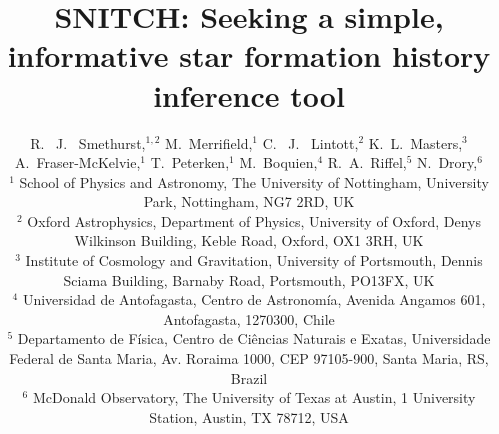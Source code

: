 \documentclass[useAMS,usenatbib]{mn2e}
\begin{document}
\title[\textsc{snitch}: inferring informative  SFHs]{SNITCH: Seeking a simple, informative star formation history inference tool}
\author[Smethurst et al. 2018]{R. ~J. ~Smethurst,$^{1,2}$ M.~Merrifield,$^{1}$ C. ~J. ~Lintott,$^{2}$ K.~L.~Masters,$^{3}$ \newauthor A.~Fraser-McKelvie,$^{1}$ T.~Peterken,$^{1}$ M.~Boquien,$^{4}$ R.~A.~Riffel,$^{5}$ N.~Drory,$^{6}$
\\ $^1$ School of Physics and Astronomy, The University of Nottingham, University Park, Nottingham, NG7 2RD, UK
\\ $^2$ Oxford Astrophysics, Department of Physics, University of Oxford, Denys Wilkinson Building, Keble Road, Oxford, OX1 3RH, UK
\\ $^3$ Institute of Cosmology and Gravitation, 
University of Portsmouth, Dennis Sciama Building, Barnaby Road, Portsmouth, PO13FX, UK
\\ $^4$ Universidad de Antofagasta, Centro de Astronom\'ia, Avenida Angamos 601, Antofagasta, 1270300, Chile
\\ $^5$ Departamento de Física, Centro de Ciências Naturais e Exatas,  Universidade Federal de Santa Maria, Av. Roraima 1000, CEP 97105-900, Santa Maria, RS, Brazil 
\\ $^6$ McDonald Observatory, The University of Texas at Austin, 1 University Station, Austin, TX 78712, USA
}

\maketitle
\end{document}
